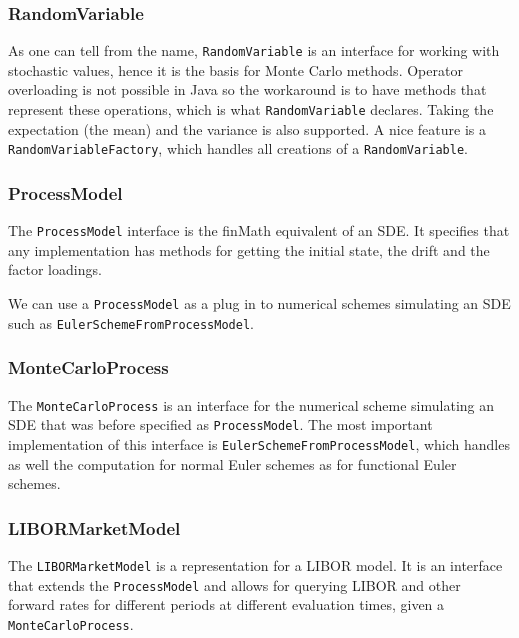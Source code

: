 \documentclass[12pt]{article}
\begin{document}
	\subsubsection*{RandomVariable}
	As one can tell from the name, \texttt{RandomVariable} is an interface for working with stochastic values, hence it is the basis for Monte Carlo methods. Operator overloading is not possible in Java so the workaround is to have methods that represent these operations, which is what \texttt{RandomVariable} declares.
	Taking the expectation (the mean) and the variance is also supported. A nice feature is a \texttt{RandomVariableFactory}, which handles all creations of a \texttt{RandomVariable}.
	
	\subsubsection*{ProcessModel}
	The \texttt{ProcessModel} interface is the finMath equivalent of an SDE. It specifies that any implementation has methods for getting the initial state, the drift and the factor loadings.
	
	
	
	We can use a \texttt{ProcessModel} as a plug in to numerical schemes simulating an SDE such as \texttt{EulerSchemeFromProcessModel}.
	
	\subsubsection*{MonteCarloProcess}
	The \texttt{MonteCarloProcess} is an interface for the numerical scheme simulating an SDE that was before specified as \texttt{ProcessModel}. The most important implementation of this interface is \texttt{EulerSchemeFromProcessModel}, which handles as well the computation for normal Euler schemes as for functional Euler schemes.
	
	\subsubsection*{LIBORMarketModel}
	The \texttt{LIBORMarketModel} is a representation for a LIBOR model. It is an interface that extends the \texttt{ProcessModel} and allows for querying LIBOR and other forward rates for different periods at different evaluation times, given a \texttt{MonteCarloProcess}.
	
\end{document}
